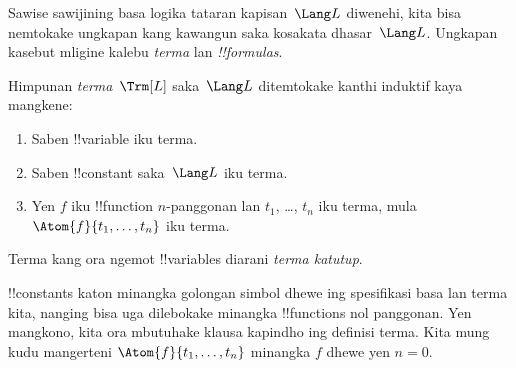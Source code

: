 \documentclass[../../../include/open-logic-section]{subfiles}
\begin{document}


Sawise sawijining basa logika tataran kapisan~$\Lang L$ diwenehi, kita bisa
nemtokake ungkapan kang kawangun saka kosakata dhasar~$\Lang L$.
Ungkapan kasebut mligine kalebu \emph{terma} lan \emph{!!{formula}s}.

\begin{defn}[Terma]
Himpunan \emph{terma}~$\Trm[L]$ saka~$\Lang L$
ditemtokake kanthi induktif kaya mangkene:
\begin{enumerate}
\item Saben !!{variable} iku terma.
\item Saben !!{constant} saka~$\Lang L$ iku terma.
\item Yen $f$ iku !!{function} $n$-panggonan lan $t_1$, \dots, $t_n$
  iku terma, mula $\Atom{f}{t_1, \ldots, t_n}$ iku terma.
\end{enumerate}
Terma kang ora ngemot !!{variable}s diarani \emph{terma katutup}.
\end{defn}

\begin{explain}
!!{constant}s katon minangka golongan simbol dhewe ing spesifikasi
basa lan terma kita, nanging bisa uga dilebokake minangka !!{function}s
nol panggonan. Yen mangkono, kita ora mbutuhake klausa kapindho ing
definisi terma. Kita mung kudu mangerteni $\Atom{f}{t_1, \ldots, t_n}$
minangka $f$ dhewe yen $n =
0$.
\end{explain}
\end{document}
